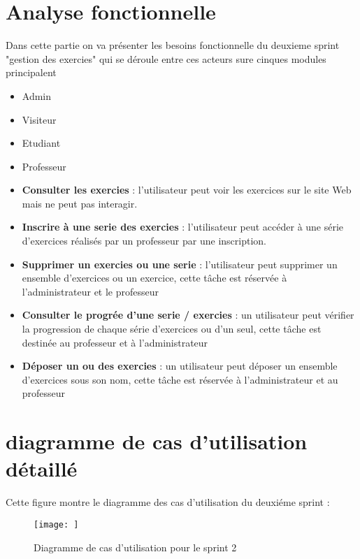 \section{Analyse fonctionnelle}
Dans cette partie on va présenter les besoins fonctionnelle du deuxieme sprint "gestion des exercies" qui se déroule entre ces acteurs sure cinques modules principalent 
\begin{itemize}
    \item Admin
    \item  Visiteur
    \item  Etudiant 
    \item  Professeur
\end{itemize}
\begin{itemize}



\vspace{15cm}

\item \textbf{ Consulter les exercies }  : l'utilisateur peut voir les exercices sur le site Web mais ne peut pas interagir. 
\item \textbf{ Inscrire à une serie des exercies } : l'utilisateur peut accéder à une série d'exercices réalisés par un professeur par une inscription.
\item \textbf{ Supprimer un exercies ou une serie } : l'utilisateur peut supprimer un ensemble d'exercices ou un exercice, cette tâche est réservée à l'administrateur et le professeur 
\item \textbf{ Consulter le progrée d'une serie / exercies }  : un utilisateur peut vérifier la progression de chaque série d'exercices ou d'un seul, cette tâche est destinée au professeur et à l'administrateur 
\item \textbf{ Déposer un ou des exercies }  : un utilisateur peut déposer un ensemble d'exercices sous son nom, cette tâche est réservée à l'administrateur et au professeur


 
\end{itemize}
\section{diagramme de cas d'utilisation détaillé}
Cette figure montre le diagramme des cas d'utilisation du deuxiéme sprint :
\begin{figure}
    \centering
    \texttt{[image: ]} 
    \caption{Diagramme de cas d'utilisation pour le sprint 2}
    \label{fig:enter-label}
\end{figure}




